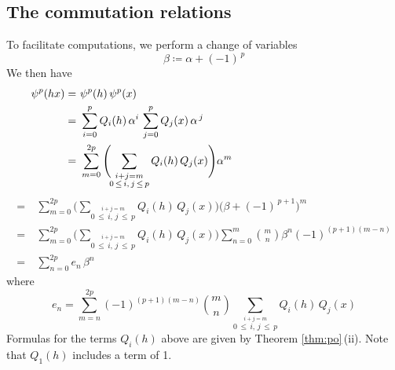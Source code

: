 \documentclass{gtpart}
\theoremstyle{definition}
\theoremstyle{remark}
\newcommand{\A}{\alpha}
\newcommand{\B}{\beta}
\newcommand{\ce}{\coloneqq}
\renewcommand{\=}{\approx}
\renewcommand{\-}{\sim}
\newcommand{\ch}[2]{{#1 \choose #2}}
\numberwithin{equation}{section}
\begin{document}
\subsection{The commutation relations}
\label{subsec:comm}

To facilitate computations, we perform a change of variables 
\[
 \B \ce \A + (-1)^{\,p} 
\]
We then have 
\[
 \begin{split}
  \psi^p(h x) = & ~ \psi^p(h) \, \psi^p(x) \hskip 7.7cm \\
              = & ~ \sum_{i = 0}^p Q_i(h) \, \A^i \, \sum_{j = 0}^p Q_j(x) \, 
                    \A^{\,j} \\
              = & ~ \sum_{m = 0}^{2 p} \Bigg(\!\! 
                    \sum_{\stackrel{\scriptstyle i + j = m}
                    {0 \,\leq\, i, \, j \,\leq\, p}} Q_i(h) \, Q_j(x) \Bigg) 
                    \A^m 
 \end{split}
\]
\[
 \begin{split}
              = & ~ \sum_{m = 0}^{2 p} \Bigg(\!\! 
                    \sum_{\stackrel{\scriptstyle i + j = m}
                    {0 \,\leq\, i, \, j \,\leq\, p}} Q_i(h) \, Q_j(x) \Bigg) 
                    \big(\B + (-1)^{\,p + 1}\big)^m \\
              = & ~ \sum_{m = 0}^{2 p} \Bigg(\!\! 
                    \sum_{\stackrel{\scriptstyle i + j = m}
                    {0 \,\leq\, i, \, j \,\leq\, p}} Q_i(h) \, Q_j(x) \Bigg) 
                    \sum_{n = 0}^m \ch{m}{n} \B^n (-1)^{(p + 1) (m - n)} \\
              = & ~ \sum_{n = 0}^{2 p} e_n \, \B^n 
 \end{split}
\]
where 
\[
  e_n = \sum_{m = n}^{2 p} (-1)^{(p + 1) (m - n)} \ch{m}{n} \! 
        \sum_{\stackrel{\scriptstyle i + j = m}{0 \,\leq\, i, \, j \,\leq\, p}} 
        Q_i(h) \, Q_j(x) 
\]
Formulas for the terms $Q_i(h)$ above are given by Theorem \ref{thm:po}\,(ii).  
Note that $Q_1(h)$ includes a term of 1.  
\end{document}
